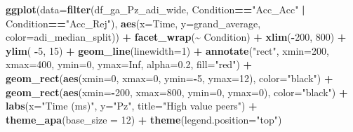 \documentclass[
]{article}
\newenvironment{Shaded}{\begin{snugshade}}{\end{snugshade}}
\newcommand{\AttributeTok}[1]{\textcolor[rgb]{0.13,0.29,0.53}{#1}}
\newcommand{\ConstantTok}[1]{\textcolor[rgb]{0.56,0.35,0.01}{#1}}
\newcommand{\DecValTok}[1]{\textcolor[rgb]{0.00,0.00,0.81}{#1}}
\newcommand{\FloatTok}[1]{\textcolor[rgb]{0.00,0.00,0.81}{#1}}
\newcommand{\FunctionTok}[1]{\textcolor[rgb]{0.13,0.29,0.53}{\textbf{#1}}}
\newcommand{\NormalTok}[1]{#1}
\newcommand{\SpecialCharTok}[1]{\textcolor[rgb]{0.81,0.36,0.00}{\textbf{#1}}}
\newcommand{\StringTok}[1]{\textcolor[rgb]{0.31,0.60,0.02}{#1}}
\begin{document}
\begin{Shaded}
\begin{Highlighting}[]
\FunctionTok{ggplot}\NormalTok{(}\AttributeTok{data=}\FunctionTok{filter}\NormalTok{(df\_ga\_Pz\_adi\_wide, Condition}\SpecialCharTok{==}\StringTok{"Acc\_Acc"} \SpecialCharTok{|}\NormalTok{ Condition}\SpecialCharTok{==}\StringTok{"Acc\_Rej"}\NormalTok{), }\FunctionTok{aes}\NormalTok{(}\AttributeTok{x=}\NormalTok{Time, }\AttributeTok{y=}\NormalTok{grand\_average, }\AttributeTok{color=}\NormalTok{adi\_median\_split)) }\SpecialCharTok{+}
  \FunctionTok{facet\_wrap}\NormalTok{(}\SpecialCharTok{\textasciitilde{}}\NormalTok{ Condition) }\SpecialCharTok{+}
  \FunctionTok{xlim}\NormalTok{(}\SpecialCharTok{{-}}\DecValTok{200}\NormalTok{, }\DecValTok{800}\NormalTok{) }\SpecialCharTok{+}
  \FunctionTok{ylim}\NormalTok{( }\SpecialCharTok{{-}}\DecValTok{5}\NormalTok{, }\DecValTok{15}\NormalTok{) }\SpecialCharTok{+}
  \FunctionTok{geom\_line}\NormalTok{(}\AttributeTok{linewidth=}\DecValTok{1}\NormalTok{) }\SpecialCharTok{+}
  \FunctionTok{annotate}\NormalTok{(}\StringTok{"rect"}\NormalTok{, }\AttributeTok{xmin=}\DecValTok{200}\NormalTok{, }\AttributeTok{xmax=}\DecValTok{400}\NormalTok{, }\AttributeTok{ymin=}\DecValTok{0}\NormalTok{, }\AttributeTok{ymax=}\ConstantTok{Inf}\NormalTok{, }\AttributeTok{alpha=}\FloatTok{0.2}\NormalTok{, }\AttributeTok{fill=}\StringTok{"red"}\NormalTok{) }\SpecialCharTok{+}
  \FunctionTok{geom\_rect}\NormalTok{(}\FunctionTok{aes}\NormalTok{(}\AttributeTok{xmin=}\DecValTok{0}\NormalTok{, }\AttributeTok{xmax=}\DecValTok{0}\NormalTok{, }\AttributeTok{ymin=}\SpecialCharTok{{-}}\DecValTok{5}\NormalTok{, }\AttributeTok{ymax=}\DecValTok{12}\NormalTok{), }\AttributeTok{color=}\StringTok{"black"}\NormalTok{) }\SpecialCharTok{+}
  \FunctionTok{geom\_rect}\NormalTok{(}\FunctionTok{aes}\NormalTok{(}\AttributeTok{xmin=}\SpecialCharTok{{-}}\DecValTok{200}\NormalTok{, }\AttributeTok{xmax=}\DecValTok{800}\NormalTok{, }\AttributeTok{ymin=}\DecValTok{0}\NormalTok{, }\AttributeTok{ymax=}\DecValTok{0}\NormalTok{), }\AttributeTok{color=}\StringTok{"black"}\NormalTok{) }\SpecialCharTok{+}
  \FunctionTok{labs}\NormalTok{(}\AttributeTok{x=}\StringTok{"Time (ms)"}\NormalTok{, }\AttributeTok{y=}\StringTok{"Pz"}\NormalTok{, }\AttributeTok{title=}\StringTok{"High value peers"}\NormalTok{) }\SpecialCharTok{+}
  \FunctionTok{theme\_apa}\NormalTok{(}\AttributeTok{base\_size =} \DecValTok{12}\NormalTok{) }\SpecialCharTok{+} \FunctionTok{theme}\NormalTok{(}\AttributeTok{legend.position=}\StringTok{"top"}\NormalTok{)}
\end{Highlighting}
\end{Shaded}
\end{document}
